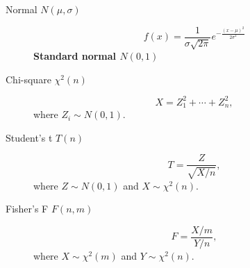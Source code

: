 \begin{multicols*}{2}
\begin{tcolorbox}[hbox, title=Continuous]
\begin{minipage}{0.4\textwidth}
\begin{description}
\item[Normal $N(\mu,\sigma)$]
      \[f(x)= \frac{1}{\sigma\sqrt{2\pi}}e^{-\frac{(x-\mu)^2}{2\sigma^2}}\]
      \textbf{Standard normal $N(0,1)$}
\item[Chi-square $\chi^2(n)$]
      \[X = Z_1^2+\cdots +Z_n^2,\]
      where $Z_i\sim N(0,1)$.
\item[Student's t $T(n)$]
      \[T = \frac{Z}{\sqrt{X/n}},\]
      where $Z\sim N(0,1)$ and $X\sim \chi^2(n)$.
\item[Fisher's F $F(n,m)$]
      \[F = \frac{X/m}{Y/n},\]
      where $X\sim \chi^2(m)$ and $Y\sim \chi^2(n)$.
\end{description}
\end{minipage}
\end{tcolorbox}

\end{multicols*}